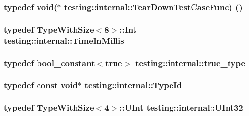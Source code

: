 \subsubsection[{\texorpdfstring{Tear\+Down\+Test\+Case\+Func}{TearDownTestCaseFunc}}]{\setlength{\rightskip}{0pt plus 5cm}typedef void($\ast$ testing\+::internal\+::\+Tear\+Down\+Test\+Case\+Func) ()}\hypertarget{namespacetesting_1_1internal_a085e31321d0d029c04d2a79234f60c1a}{}\label{namespacetesting_1_1internal_a085e31321d0d029c04d2a79234f60c1a}
\subsubsection[{\texorpdfstring{Time\+In\+Millis}{TimeInMillis}}]{\setlength{\rightskip}{0pt plus 5cm}typedef {\bf Type\+With\+Size}$<$8$>$\+::Int {\bf testing\+::internal\+::\+Time\+In\+Millis}}\hypertarget{namespacetesting_1_1internal_a66a845df404b38fe85c5e14a069f255a}{}\label{namespacetesting_1_1internal_a66a845df404b38fe85c5e14a069f255a}
\subsubsection[{\texorpdfstring{true\+\_\+type}{true_type}}]{\setlength{\rightskip}{0pt plus 5cm}typedef {\bf bool\+\_\+constant}$<$true$>$ {\bf testing\+::internal\+::true\+\_\+type}}\hypertarget{namespacetesting_1_1internal_a62f917c3424d8841de9b49b5ec28edb4}{}\label{namespacetesting_1_1internal_a62f917c3424d8841de9b49b5ec28edb4}
\subsubsection[{\texorpdfstring{Type\+Id}{TypeId}}]{\setlength{\rightskip}{0pt plus 5cm}typedef const void$\ast$ {\bf testing\+::internal\+::\+Type\+Id}}\hypertarget{namespacetesting_1_1internal_ab1114197d3c657d8b7f8e0c5caa12d00}{}\label{namespacetesting_1_1internal_ab1114197d3c657d8b7f8e0c5caa12d00}
\subsubsection[{\texorpdfstring{U\+Int32}{UInt32}}]{\setlength{\rightskip}{0pt plus 5cm}typedef {\bf Type\+With\+Size}$<$4$>$\+::U\+Int {\bf testing\+::internal\+::\+U\+Int32}}\hypertarget{namespacetesting_1_1internal_a40d4fffcd2bf56f18b1c380615aa85e3}{}\label{namespacetesting_1_1internal_a40d4fffcd2bf56f18b1c380615aa85e3}
